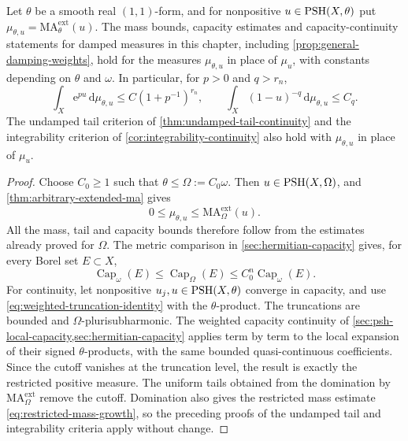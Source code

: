 \begin{theorem}\label{thm:general-background-damping}
Let $\theta$ be a smooth real $(1,1)$-form, and for nonpositive $u\in\mathrm{PSH}(X,\theta)$ put $\mu_{\theta,u}=\mathrm{MA}^{\mathrm{ext}}_\theta(u)$. The mass bounds, capacity estimates and capacity-continuity statements for damped measures in this chapter, including \cref{prop:general-damping-weights}, hold for the measures $\mu_{\theta,u}$ in place of $\mu_u$, with constants depending on $\theta$ and $\omega$. In particular, for $p>0$ and $q>r_n$,
\[
 \int_X\mathrm{e}^{pu}\,\mathrm{d}\mu_{\theta,u}
 \leq C(1+p^{-1})^{r_n},\qquad
 \int_X(1-u)^{-q}\,\mathrm{d}\mu_{\theta,u}\leq C_q.
\]
The undamped tail criterion of \cref{thm:undamped-tail-continuity} and the integrability criterion of \cref{cor:integrability-continuity} also hold with $\mu_{\theta,u}$ in place of $\mu_u$.
\end{theorem}
\begin{proof}
Choose $C_0\geq1$ such that $\theta\leq\Omega:=C_0\omega$. Then $u\in\mathrm{PSH}(X,\Omega)$, and \cref{thm:arbitrary-extended-ma} gives
\[
 0\leq\mu_{\theta,u}\leq\mathrm{MA}^{\mathrm{ext}}_\Omega(u).
\]
All the mass, tail and capacity bounds therefore follow from the estimates already proved for $\Omega$. The metric comparison in \cref{sec:hermitian-capacity} gives, for every Borel set $E\subset X$,
\[
 \operatorname{Cap}_\omega(E)
 \leq\operatorname{Cap}_\Omega(E)
 \leq C_0^n\operatorname{Cap}_\omega(E).
\]
For continuity, let nonpositive $u_j,u\in\mathrm{PSH}(X,\theta)$ converge in capacity, and use \eqref{eq:weighted-truncation-identity} with the $\theta$-product. The truncations are bounded and $\Omega$-plurisubharmonic. The weighted capacity continuity of \cref{sec:psh-local-capacity,sec:hermitian-capacity} applies term by term to the local expansion of their signed $\theta$-products, with the same bounded quasi-continuous coefficients. Since the cutoff vanishes at the truncation level, the result is exactly the restricted positive measure. The uniform tails obtained from the domination by $\mathrm{MA}^{\mathrm{ext}}_\Omega$ remove the cutoff. Domination also gives the restricted mass estimate \eqref{eq:restricted-mass-growth}, so the preceding proofs of the undamped tail and integrability criteria apply without change.
\end{proof}
